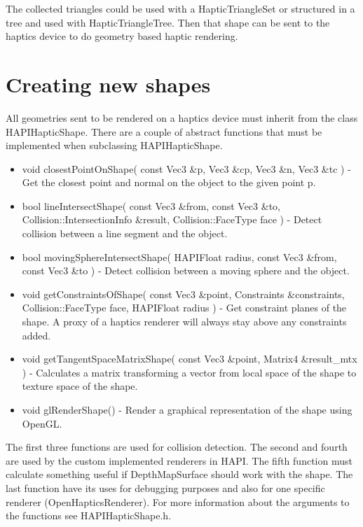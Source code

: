 

The collected triangles could be used with a HapticTriangleSet or structured
in a tree and used with HapticTriangleTree. Then that shape can be sent to
the haptics device to do geometry based haptic rendering.

\section{Creating new shapes}
All geometries sent to be rendered on a haptics device must
inherit from the class HAPIHapticShape. There are a couple of abstract functions
that must be implemented when subclassing HAPIHapticShape.

\begin{itemize}
\item void closestPointOnShape( const Vec3 \&p, Vec3 \&cp, Vec3 \&n, Vec3 \&tc )
- Get the closest point and normal on the object to the given point p.
\item bool lineIntersectShape( const Vec3 \&from, const Vec3 \&to, Collision::IntersectionInfo \&result, Collision::FaceType face )
- Detect collision between a line segment and the object.
\item bool movingSphereIntersectShape( HAPIFloat radius, const Vec3 \&from, const Vec3 \&to )
- Detect collision between a moving sphere and the object.
\item void getConstraintsOfShape( const Vec3 \&point, Constraints \&constraints, Collision::FaceType face, HAPIFloat radius )
- Get constraint planes of the shape. A proxy of a haptics renderer will always stay above any constraints added.
\item void getTangentSpaceMatrixShape( const Vec3 \&point, Matrix4 \&result\_mtx )
- Calculates a matrix transforming a vector from local space of the shape to texture space of the shape.
\item void glRenderShape() - Render a graphical representation of the shape using OpenGL.
\end{itemize}

The first three functions are used for collision detection. The second and
fourth are used by the custom implemented renderers in HAPI. The fifth
function must calculate something useful if DepthMapSurface should work with
the shape. The last function have its uses for debugging purposes and also for
one specific renderer (OpenHapticsRenderer). For more information about the
arguments to the functions see HAPIHapticShape.h.